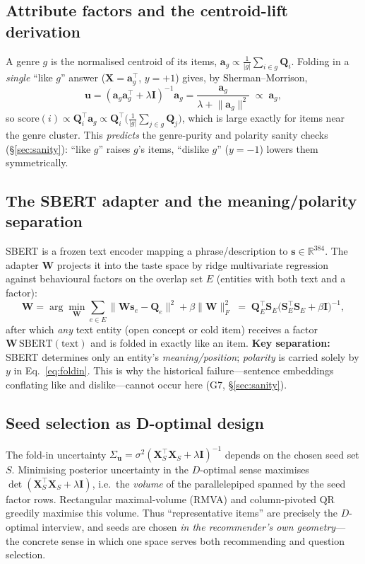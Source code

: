 \documentclass[11pt]{article}
\newcommand{\R}{\mathbb{R}}
\newcommand{\Q}{\mathbf{Q}}
\newcommand{\X}{\mathbf{X}}
\newcommand{\uu}{\mathbf{u}}
\newcommand{\W}{\mathbf{W}}
\newcommand{\I}{\mathbf{I}}
\begin{document}
\subsection{Attribute factors and the centroid-lift derivation}\label{sec:attr}
A genre $g$ is the normalised centroid of its items, $\mathbf a_g \propto \tfrac1{|g|}\sum_{i\in g}\Q_i$. Folding
in a \emph{single} ``like $g$'' answer ($\X=\mathbf a_g^\top$, $y=+1$) gives, by Sherman--Morrison,
\begin{equation}
  \uu=(\mathbf a_g\mathbf a_g^\top+\lambda\I)^{-1}\mathbf a_g
     =\frac{\mathbf a_g}{\lambda+\lVert\mathbf a_g\rVert^2}\;\propto\;\mathbf a_g,
\end{equation}
so $\mathrm{score}(i)\propto \Q_i^\top\mathbf a_g \propto \Q_i^\top\!\bigl(\tfrac1{|g|}\sum_{j\in g}\Q_j\bigr)$,
which is large exactly for items near the genre cluster. This \emph{predicts} the genre-purity and polarity sanity
checks (\S\ref{sec:sanity}): ``like $g$'' raises $g$'s items, ``dislike $g$'' ($y={-}1$) lowers them
symmetrically.

\subsection{The SBERT adapter and the meaning/polarity separation}\label{sec:sbert}
SBERT is a frozen text encoder mapping a phrase/description to $\mathbf s\in\R^{384}$. The adapter $\W$ projects it
into the taste space by ridge multivariate regression against behavioural factors on the overlap set $E$ (entities
with both text and a factor):
\begin{equation}
  \W=\arg\min_{\W}\sum_{e\in E}\lVert\W\mathbf s_e-\Q_e\rVert^2+\beta\lVert\W\rVert_F^2
   \;=\;\Q_E^\top \mathbf S_E\bigl(\mathbf S_E^\top\mathbf S_E+\beta\I\bigr)^{-1},
\end{equation}
after which \emph{any} text entity (open concept or cold item) receives a factor $\W\,\mathrm{SBERT}(\text{text})$
and is folded in exactly like an item. \textbf{Key separation:} SBERT determines only an entity's
\emph{meaning/position}; \emph{polarity} is carried solely by $y$ in Eq.~\eqref{eq:foldin}. This is why the
historical failure---sentence embeddings conflating like and dislike---cannot occur here (G7, \S\ref{sec:sanity}).

\subsection{Seed selection as D-optimal design}\label{sec:rmva}
The fold-in uncertainty $\Sigma_{\uu}=\sigma^2(\X_S^\top\X_S+\lambda\I)^{-1}$ depends on the chosen seed set $S$.
Minimising posterior uncertainty in the $D$-optimal sense maximises
$\det(\X_S^\top\X_S+\lambda\I)$, i.e.\ the \emph{volume} of the parallelepiped spanned by the seed factor rows.
Rectangular maximal-volume (RMVA) and column-pivoted QR greedily maximise this volume. Thus ``representative
items'' are precisely the $D$-optimal interview, and seeds are chosen \emph{in the recommender's own geometry}---
the concrete sense in which one space serves both recommending and question selection.
\end{document}
